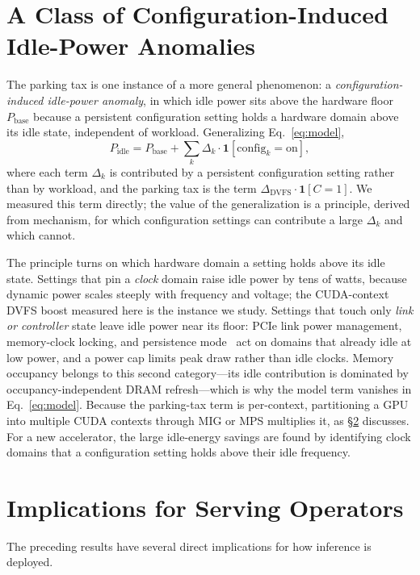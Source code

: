 \documentclass[conference]{IEEEtran}
\begin{document}
\section{A Class of Configuration-Induced Idle-Power Anomalies}
\label{sec:taxonomy}
The parking tax is one instance of a more general phenomenon: a \emph{configuration-induced idle-power anomaly}, in which idle power sits above the hardware floor $P_{\text{base}}$ because a persistent configuration setting holds a hardware domain above its idle state, independent of workload. Generalizing Eq.~\ref{eq:model},
\begin{equation}
P_{\text{idle}} = P_{\text{base}} + \sum_k \Delta_k \cdot \mathbf{1}[\text{config}_k=\text{on}],
\label{eq:general}
\end{equation}
where each term $\Delta_k$ is contributed by a persistent configuration setting rather than by workload, and the parking tax is the term $\Delta_{\text{DVFS}}\!\cdot\!\mathbf{1}[C=1]$. We measured this term directly; the value of the generalization is a principle, derived from mechanism, for which configuration settings can contribute a large $\Delta_k$ and which cannot.

The principle turns on which hardware domain a setting holds above its idle state. Settings that pin a \emph{clock} domain raise idle power by tens of watts, because dynamic power scales steeply with frequency and voltage; the CUDA-context DVFS boost measured here is the instance we study. Settings that touch only \emph{link or controller} state leave idle power near its floor: PCIe link power management, memory-clock locking, and persistence mode~\cite{nvidia-smi} act on domains that already idle at low power, and a power cap limits peak draw rather than idle clocks. Memory occupancy belongs to this second category---its idle contribution is dominated by occupancy-independent DRAM refresh---which is why the model term vanishes in Eq.~\ref{eq:model}. Because the parking-tax term is per-context, partitioning a GPU into multiple CUDA contexts through MIG or MPS multiplies it, as \S\ref{sec:consequences} discusses. For a new accelerator, the large idle-energy savings are found by identifying clock domains that a configuration setting holds above their idle frequency.

\section{Implications for Serving Operators}
\label{sec:consequences}
The preceding results have several direct implications for how inference is deployed.
\end{document}
